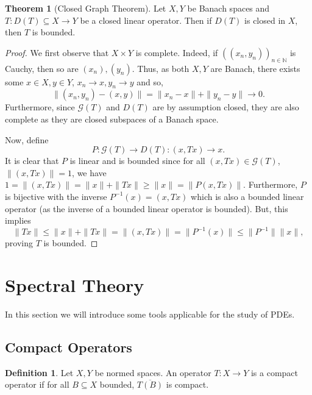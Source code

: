\documentclass[]{article}
\theoremstyle{definition}
\newtheorem{theorem}{Theorem}
\theoremstyle{definition}
\newtheorem{definition}{Definition}[section]
\begin{document}
\begin{theorem}[Closed Graph Theorem]
  Let \(X, Y\) be Banach spaces and \(T : D(T) \subseteq X \to Y\) be a closed 
  linear operator. Then if \(D(T)\) is closed in \(X\), then \(T\) is bounded.
\end{theorem}
\begin{proof}
  We first observe that \(X \times Y\) is complete. Indeed, if 
  \(((x_n, y_n))_{n \in \mathbb{N}}\) is Cauchy, then so are \((x_n), (y_n)\). 
  Thus, as both \(X, Y\) are Banach, there exists some \(x \in X, y \in Y\), 
  \(x_n \to x, y_n \to y\) and so, 
  \[\|(x_n, y_n) - (x, y)\| = \|x_n - x\| + \|y_n - y\| \to 0.\]
  Furthermore, since \(\mathcal{G}(T)\) and \(D(T)\) are by assumption closed, 
  they are also complete as they are closed subspaces of a Banach space.

  Now, define 
  \[P : \mathcal{G}(T) \to D(T) : (x, Tx) \to x.\]
  It is clear that \(P\) is linear and is bounded since for all \((x, Tx) \in 
  \mathcal{G}(T)\), \(\|(x, Tx)\| = 1\), we have 
  \(1 = \|(x, Tx)\| = \|x\| + \|Tx\| \ge \|x\| = \|P(x, Tx)\|\). Furthermore, 
  \(P\) is bijective with the inverse \(P^{-1}(x) = (x, Tx)\) which is also 
  a bounded linear operator (as the inverse of a bounded linear operator is 
  bounded). But, this implies 
  \[\|Tx\| \le \|x\| + \|Tx\| = \|(x, Tx)\| = \|P^{-1}(x)\| \le \|P^{-1}\|\|x\|,\]
  proving \(T\) is bounded.
\end{proof}

\newpage
\section{Spectral Theory}

In this section we will introduce some tools applicable for the study of PDEs.

\subsection{Compact Operators}

\begin{definition}
  Let \(X, Y\) be normed spaces. An operator \(T : X \to Y\) is a compact operator 
  if for all \(B \subseteq X\) bounded, \(\overline{T(B)}\) is compact.
\end{definition}
\end{document}
